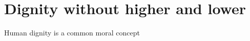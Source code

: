 
\chapter{Dignity without higher and lower}
\label{chap:dignity}

Human dignity is a common moral concept \citep{kant}
